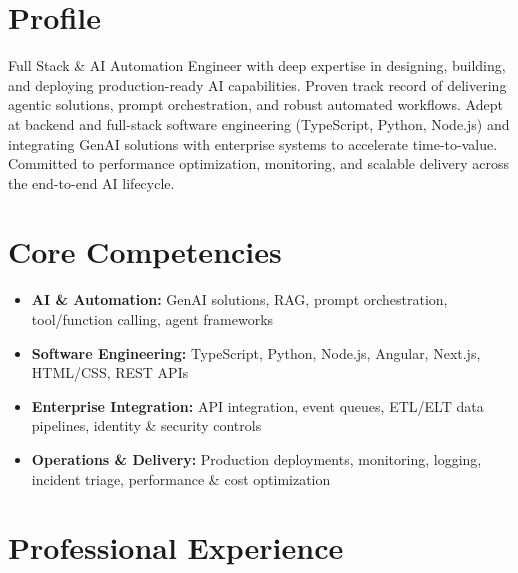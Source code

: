 \documentclass[11pt,a4paper,sans]{moderncv}
\begin{document}
\makecvtitle

\section{Profile}
Full Stack \& AI Automation Engineer with deep expertise in designing, building, and deploying production-ready AI capabilities. Proven track record of delivering agentic solutions, prompt orchestration, and robust automated workflows. Adept at backend and full-stack software engineering (TypeScript, Python, Node.js) and integrating GenAI solutions with enterprise systems to accelerate time-to-value. Committed to performance optimization, monitoring, and scalable delivery across the end-to-end AI lifecycle.

\section{Core Competencies}
\begin{itemize}
\item \textbf{AI \& Automation:} GenAI solutions, RAG, prompt orchestration, tool/function calling, agent frameworks
\item \textbf{Software Engineering:} TypeScript, Python, Node.js, Angular, Next.js, HTML/CSS, REST APIs
\item \textbf{Enterprise Integration:} API integration, event queues, ETL/ELT data pipelines, identity \& security controls
\item \textbf{Operations \& Delivery:} Production deployments, monitoring, logging, incident triage, performance \& cost optimization
\end{itemize}

\section{Professional Experience}

\end{document}
